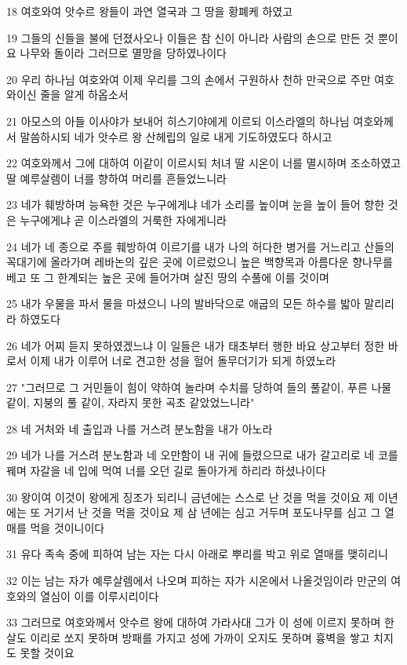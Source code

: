 \par 18 여호와여 앗수르 왕들이 과연 열국과 그 땅을 황폐케 하였고
\par 19 그들의 신들을 불에 던졌사오나 이들은 참 신이 아니라 사람의 손으로 만든 것 뿐이요 나무와 돌이라 그러므로 멸망을 당하였나이다
\par 20 우리 하나님 여호와여 이제 우리를 그의 손에서 구원하사 천하 만국으로 주만 여호와이신 줄을 알게 하옵소서
\par 21 아모스의 아들 이사야가 보내어 히스기야에게 이르되 이스라엘의 하나님 여호와께서 말씀하시되 네가 앗수르 왕 산헤립의 일로 내게 기도하였도다 하시고
\par 22 여호와께서 그에 대하여 이같이 이르시되 처녀 딸 시온이 너를 멸시하며 조소하였고 딸 예루살렘이 너를 향하여 머리를 흔들었느니라
\par 23 네가 훼방하며 능욕한 것은 누구에게냐 네가 소리를 높이며 눈을 높이 들어 향한 것은 누구에게냐 곧 이스라엘의 거룩한 자에게니라
\par 24 네가 네 종으로 주를 훼방하여 이르기를 내가 나의 허다한 병거를 거느리고 산들의 꼭대기에 올라가며 레바논의 깊은 곳에 이르렀으니 높은 백향목과 아름다운 향나무를 베고 또 그 한계되는 높은 곳에 들어가며 살진 땅의 수풀에 이를 것이며
\par 25 내가 우물을 파서 물을 마셨으니 나의 발바닥으로 애굽의 모든 하수를 밟아 말리리라 하였도다
\par 26 네가 어찌 듣지 못하였겠느냐 이 일들은 내가 태초부터 행한 바요 상고부터 정한 바로서 이제 내가 이루어 너로 견고한 성을 헐어 돌무더기가 되게 하였노라
\par 27 "그러므로 그 거민들이 힘이 약하여 놀라며 수치를 당하여 들의 풀같이, 푸른 나물 같이, 지붕의 풀 같이, 자라지 못한 곡초 같았었느니라"
\par 28 네 거처와 네 출입과 나를 거스려 분노함을 내가 아노라
\par 29 네가 나를 거스려 분노함과 네 오만함이 내 귀에 들렸으므로 내가 갈고리로 네 코를 꿰며 자갈을 네 입에 먹여 너를 오던 길로 돌아가게 하리라 하셨나이다
\par 30 왕이여 이것이 왕에게 징조가 되리니 금년에는 스스로 난 것을 먹을 것이요 제 이년에는 또 거기서 난 것을 먹을 것이요 제 삼 년에는 심고 거두며 포도나무를 심고 그 열매를 먹을 것이니이다
\par 31 유다 족속 중에 피하여 남는 자는 다시 아래로 뿌리를 박고 위로 열매를 맺히리니
\par 32 이는 남는 자가 예루살렘에서 나오며 피하는 자가 시온에서 나올것임이라 만군의 여호와의 열심이 이를 이루시리이다
\par 33 그러므로 여호와께서 앗수르 왕에 대하여 가라사대 그가 이 성에 이르지 못하며 한 살도 이리로 쏘지 못하며 방패를 가지고 성에 가까이 오지도 못하며 흉벽을 쌓고 치지도 못할 것이요

